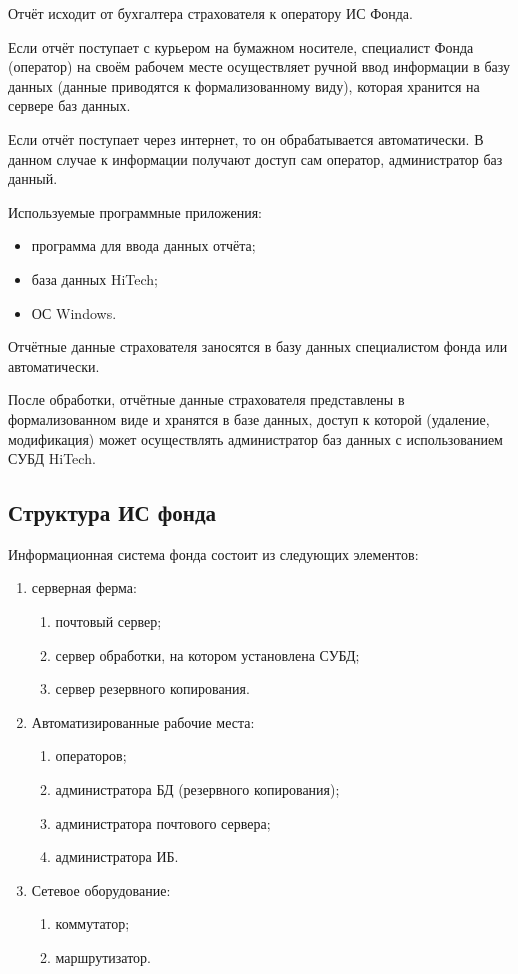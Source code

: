 Отчёт исходит от бухгалтера страхователя к оператору ИС Фонда.

\point Если отчёт поступает с курьером на бумажном носителе,
специалист Фонда (оператор) на своём рабочем месте осуществляет ручной
ввод информации в базу данных (данные приводятся к формализованному
виду), которая хранится на сервере баз данных.

Если отчёт поступает через интернет, то он обрабатывается
автоматически. В данном случае к информации получают доступ сам
оператор, администратор баз данный.

\point Используемые программные приложения:

\begin{itemize}
\item программа для ввода данных отчёта;
\item база данных HiTech;
\item ОС Windows.
\end{itemize}

\point Отчётные данные страхователя заносятся в базу данных
специалистом фонда или автоматически.

\point После обработки, отчётные данные страхователя представлены в
формализованном виде и хранятся в базе данных, доступ к которой
(удаление, модификация) может осуществлять администратор баз данных с
использованием СУБД HiTech.

\subsection{Структура ИС фонда}

\point Информационная система фонда состоит из следующих элементов:

\begin{enumerate}
\item серверная ферма:
  \begin{enumerate}
  \item почтовый сервер;
  \item сервер обработки, на котором установлена СУБД;
  \item сервер резервного копирования.
  \end{enumerate}
\item Автоматизированные рабочие места:
  \begin{enumerate}
  \item операторов;
  \item администратора БД (резервного копирования);
  \item администратора почтового сервера;
  \item администратора ИБ.
  \end{enumerate}
\item Сетевое оборудование:
  \begin{enumerate}
  \item коммутатор;
  \item маршрутизатор.
  \end{enumerate}
\end{enumerate}

